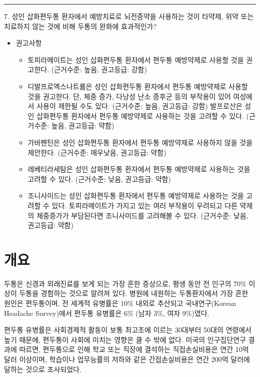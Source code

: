 \documentclass[]{book}
\providecommand{\tightlist}{%
  \setlength{\itemsep}{0pt}\setlength{\parskip}{0pt}}
\begin{document}
\begin{center}\rule{0.5\linewidth}{\linethickness}\end{center}

7. 성인 삽화편두통 환자에서 예방치료로 뇌전증약을 사용하는 것이 타약제, 위약 또는 치료하지 않는 것에 비해 두통의 완화에 효과적인가?

\begin{itemize}
\item
  권고사항

  \begin{itemize}
  \tightlist
  \item
    토피라메이트는 성인 삽화편두통 환자에서 편두통 예방약제로 사용할 것을 권고한다. (근거수준: 높음, 권고등급: 강함)
  \item
    디발프로엑스나트륨은 성인 삽화편두통 환자에서 편두통 예방약제로 사용할 것을 권고한다. 단, 체중 증가, 다낭성 난소 증후군 등의 부작용이 있어 여성에서 사용이 제한될 수도 있다. (근거수준: 높음, 권고등급: 강함) 발프로산은 성인 삽화편두통 환자에서 편두통 예방약제로 사용하는 것을 고려할 수 있다. (근거수준: 높음, 권고등급: 약함)
  \item
    가바펜틴은 성인 삽화편두통 환자에서 편두통 예방약제로 사용하지 않을 것을 제안한다. (근거수준: 매우낮음, 권고등급: 약함)
  \item
    레베티라세탐은 성인 삽화편두통 환자에서 편두통 예방약제로 사용하는 것을 고려할 수 있다. (근거수준: 낮음, 권고등급: 약함)
  \item
    조니사미드는 성인 삽화편두통 환자에서 편두통 예방약제로 사용하는 것을 고려할 수 있다. 토피라메이트가 가지고 있는 여러 부작용이 우려되고 다른 약제의 체중증가가 부담된다면 조니사미드를 고려해볼 수 있다. (근거수준: 낮음, 권고등급: 약함)
  \end{itemize}
\end{itemize}

\hypertarget{section-4}{%
\chapter{개요}\label{section-4}}

두통은 신경과 외래진료를 보게 되는 가장 흔한 증상으로, 평생 동안 전 인구의 70\% 이상이 두통을 경험하는 것으로 알려져 있다. 병원에 내원하는 두통환자에서 가장 흔한 원인은 편두통이며, 전 세계적 유병률은 10\% 내외로 추산되고 국내연구(Korean Headache Survey)에서 편두통 유병률은 6\% (남자 3\%, 여자 9\%)였다.

편두통 유병률은 사회경제적 활동이 보통 최고조에 이르는 30대부터 50대의 연령에서 높기 때문에, 편두통이 사회에 미치는 영향은 클 수 밖에 없다. 미국의 인구집단연구 결과에 따르면, 편두통으로 인해 학교 또는 직장에 결석하는 직접손실비용은 연간 10억 달러 이상이며, 학습이나 업무능률의 저하와 같은 간접손실비용은 연간 200억 달러에 달하는 것으로 조사되었다.
\end{document}
